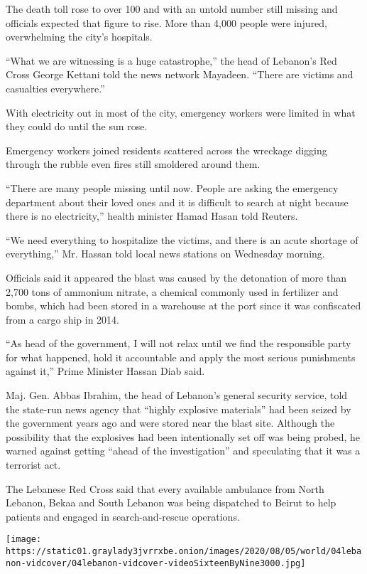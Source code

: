 The death toll rose to over 100 and with an untold number still missing
and officials expected that figure to rise. More than 4,000 people were
injured, overwhelming the city's hospitals.

``What we are witnessing is a huge catastrophe,'' the head of Lebanon's
Red Cross George Kettani told the news network Mayadeen. ``There are
victims and casualties everywhere.''

With electricity out in most of the city, emergency workers were limited
in what they could do until the sun rose.

Emergency workers joined residents scattered across the wreckage digging
through the rubble even fires still smoldered around them.

``There are many people missing until now. People are asking the
emergency department about their loved ones and it is difficult to
search at night because there is no electricity,'' health minister Hamad
Hasan told Reuters.

``We need everything to hospitalize the victims, and there is an acute
shortage of everything,'' Mr. Hassan told local news stations on
Wednesday morning.

Officials said it appeared the blast was caused by the detonation of
more than 2,700 tons of ammonium nitrate, a chemical commonly used in
fertilizer and bombs, which had been stored in a warehouse at the port
since it was confiscated from a cargo ship in 2014.

``As head of the government, I will not relax until we find the
responsible party for what happened, hold it accountable and apply the
most serious punishments against it,'' Prime Minister Hassan Diab said.

Maj. Gen. Abbas Ibrahim, the head of Lebanon's general security service,
told the state-run news agency that ``highly explosive materials'' had
been seized by the government years ago and were stored near the blast
site. Although the possibility that the explosives had been
intentionally set off was being probed, he warned against getting
``ahead of the investigation'' and speculating that it was a terrorist
act.

The Lebanese Red Cross said that every available ambulance from North
Lebanon, Bekaa and South Lebanon was being dispatched to Beirut to help
patients and engaged in search-and-rescue operations.

\texttt{[image: https://static01.graylady3jvrrxbe.onion/images/2020/08/05/world/04lebanon-vidcover/04lebanon-vidcover-videoSixteenByNine3000.jpg]}

